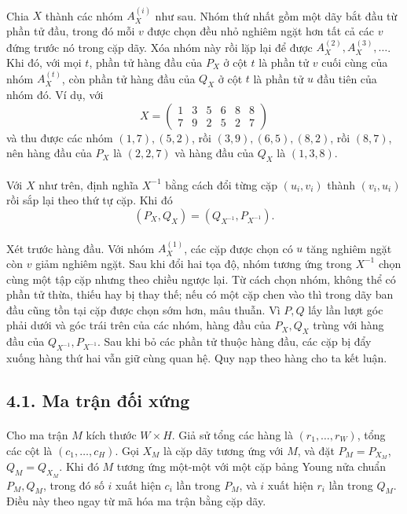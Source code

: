 \documentclass[11pt]{article}
\begin{document}
\paragraph{}
Chia \(X\) thành các nhóm \(A_X^{(i)}\) như sau. Nhóm thứ nhất gồm một dãy bắt
đầu từ phần tử đầu, trong đó mỗi \(v\) được chọn đều nhỏ nghiêm ngặt hơn tất
cả các \(v\) đứng trước nó trong cặp dãy. Xóa nhóm này rồi lặp lại để được
\(A_X^{(2)},A_X^{(3)},\ldots\). Khi đó, với mọi \(t\), phần tử hàng đầu của
\(P_X\) ở cột \(t\) là phần tử \(v\) cuối cùng của nhóm \(A_X^{(t)}\), còn
phần tử hàng đầu của \(Q_X\) ở cột \(t\) là phần tử \(u\) đầu tiên của nhóm
đó. Ví dụ, với
\[
X=\begin{pmatrix}1&3&5&6&8&8\\7&9&2&5&2&7\end{pmatrix}
\]
và thu được các nhóm
\((1,7),(5,2)\), rồi \((3,9),(6,5),(8,2)\), rồi \((8,7)\), nên hàng đầu của
\(P_X\) là \((2,2,7)\) và hàng đầu của \(Q_X\) là \((1,3,8)\).

\paragraph{}
Với \(X\) như trên, định nghĩa \(X^{-1}\) bằng cách đổi từng cặp
\((u_i,v_i)\) thành \((v_i,u_i)\) rồi sắp lại theo thứ tự cặp. Khi đó
\[
(P_X,Q_X)=(Q_{X^{-1}},P_{X^{-1}}).
\]

\paragraph{}
Xét trước hàng đầu. Với nhóm \(A_X^{(1)}\), các cặp được chọn có \(u\) tăng
nghiêm ngặt còn \(v\) giảm nghiêm ngặt. Sau khi đổi hai tọa độ, nhóm tương ứng
trong \(X^{-1}\) chọn cùng một tập cặp nhưng theo chiều ngược lại. Từ cách
chọn nhóm, không thể có phần tử thừa, thiếu hay bị thay thế; nếu có một cặp
chen vào thì trong dãy ban đầu cũng tồn tại cặp được chọn sớm hơn, mâu thuẫn.
Vì \(P,Q\) lấy lần lượt góc phải dưới và góc trái trên của các nhóm, hàng đầu
của \(P_X,Q_X\) trùng với hàng đầu của \(Q_{X^{-1}},P_{X^{-1}}\). Sau khi bỏ
các phần tử thuộc hàng đầu, các cặp bị đẩy xuống hàng thứ hai vẫn giữ cùng
quan hệ. Quy nạp theo hàng cho ta kết luận.

\subsection*{4.1. Ma trận đối xứng}

\paragraph{}
Cho ma trận \(M\) kích thước \(W\times H\). Giả sử tổng các hàng là
\((r_1,\ldots,r_W)\), tổng các cột là \((c_1,\ldots,c_H)\). Gọi \(X_M\) là
cặp dãy tương ứng với \(M\), và đặt \(P_M=P_{X_M}\), \(Q_M=Q_{X_M}\). Khi đó
\(M\) tương ứng một-một với một cặp bảng Young nửa chuẩn \(P_M,Q_M\), trong
đó số \(i\) xuất hiện \(c_i\) lần trong \(P_M\), và \(i\) xuất hiện \(r_i\)
lần trong \(Q_M\). Điều này theo ngay từ mã hóa ma trận bằng cặp dãy.
\end{document}
